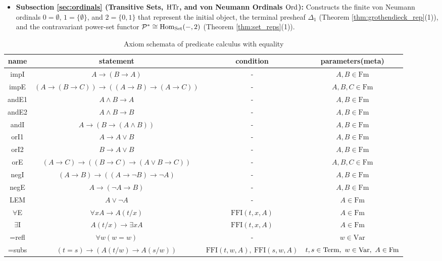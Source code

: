 \documentclass[10pt,a4paper]{article}
\begin{document}
\begin{itemize}
\item \textbf{Subsection \ref{sec:ordinals} (Transitive Sets, ${\textrm{HTr}}$, and von Neumann Ordinals ${\textrm{Ord}}$):} Constructs the finite von Neumann ordinals $0 = \emptyset$, $1 = \{\emptyset\}$, and $2 = \{0, 1\}$ that represent the initial object, the terminal presheaf $\Delta_1$ (Theorem \ref{thm:grothendieck_rep}(1)), and the contravariant power-set functor ${\mathcal{P}}^* \cong {\textrm{Hom}}_{\textrm{Set}}(-, 2)$ (Theorem \ref{thm:set_reps}(1)).
\end{itemize}

\begin{table}[H]
\centering
\setlength{\tabcolsep}{4.5pt}
\caption{Axiom schemata of predicate calculus with equality}
\label{tab:axiompltab}
\begin{tabular}{|c|c|c|c|}
\hline
name & statement & condition & parameters(meta)\\ \hline
\hline
impI & $A \to (B \to A)$ & - & $A,B \in \textrm{Fm}$\\ %
impE & $(A \to (B \to C))\to((A\to B)\to(A\to C))$ & -& $A,B,C \in \textrm{Fm}$\\ \hline
\hline
andE1 & $A \land B \to A$& -& $A,B \in \textrm{Fm}$\\ %
andE2 & $A \land B \to B$& -& $A,B \in \textrm{Fm}$\\ %
andI & $A\to(B\to (A \land B))$& -& $A,B \in \textrm{Fm}$\\ \hline
\hline
orI1 & $A \to  A \lor B$& -& $A,B \in \textrm{Fm}$\\ %
orI2 & $B \to  A \lor B$& -& $A,B \in \textrm{Fm}$\\ %
orE & $(A \to  C)\to ((B \to  C) \to  (A \lor B \to  C))$& -& $A,B,C \in \textrm{Fm}$\\ \hline
\hline
negI & $(A \to  B) \to  ((A \to  \neg B) \to  \neg A)$& -& $A,B \in \textrm{Fm}$\\ %
negE & $A \to  (\neg A \to  B)$& -& $A,B \in \textrm{Fm}$\\ \hline
\hline
LEM & $A \lor \neg A$& -& $A \in \textrm{Fm}$\\ \hline
\hline
$\forall$E & $\forall xA\to A(t/x)$ & $\textrm{FFI}(t,x,A)$& $A \in \textrm{Fm}$\\ %
$\exists$I & $A(t/x)\to \exists x A$ & $\textrm{FFI}(t,x,A)$& $A \in \textrm{Fm}$\\ \hline
\hline
=refl&$\forall w (w=w)$&-& $w \in \textrm{Var}$\\
=subs&$(t=s)\to ( A(t/w)\to A(s/w)) $&$\textrm{FFI}(t,w,A),\ \textrm{FFI}(s,w,A)$& $t,s \in {\textrm{Term}},\ w \in {\textrm{Var}},\ A \in {\textrm{Fm}}$\\\hline
\end{tabular}
\end{table}
\end{document}
